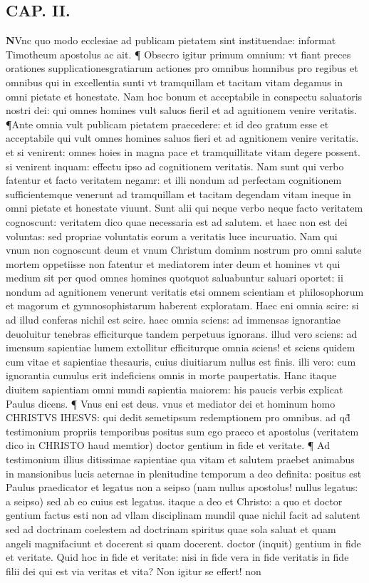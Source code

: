 \documentclass{article}
\begin{document}
\begin{pages}
\section{CAP. II.}\pstart \huge\textbf{N}\normalsize Vnc quo modo ecclesiae ad publicam pietatem sint instituendae: informat Timotheum apostolus ac ait. ¶ Obsecro igitur primum omnium: vt fiant preces orationes supplicationesgratiarum actiones pro omnibus homnibus pro regibus et omnibus qui in excellentia sunti vt tramquillam et tacitam vitam degamus in omni pietate et honestate. Nam hoc bonum et acceptabile in conspectu saluatoris nostri dei: qui omnes homines vult saluos fieril et ad agnitionem venire veritatis. ¶Ante omnia vult publicam pietatem praecedere: et id deo gratum esse et acceptabile qui vult omnes homines saluos fieri et ad agnitionem venire veritatis. et si venirent: omnes hoies in magna pace et tramquillitate vitam degere possent. si venirent inquam: effectu ipso ad cognitionem veritatis. Nam sunt qui verbo fatentur et facto veritatem negamr: et illi nondum ad perfectam cognitionem sufficientemque  venerunt ad tramquillam et tacitam degendam vitam ineque  in omni pietate et honestate viuunt. Sunt alii qui neque  verbo neque  facto veritatem cognoscunt: veritatem dico quae necessaria est ad salutem. et haec non est dei voluntas: sed propriae voluntatis eorum a veritatis luce incuruatio. Nam qui vnum non cognoscunt deum et vnum Christum dominm nostrum pro omni salute mortem oppetiisse non fatentur et mediatorem inter deum et homines vt qui medium sit per quod  omnes homines quotquot saluabuntur saluari oportet: ii nondum ad agnitionem venerunt veritatis etsi omnem scientiam et philosophorum et magorum et gymnosophistarum haberent exploratam. Haec eni omnia scire: si ad illud conferas nichil est scire. haec omnia sciens: ad immensas ignorantiae deuoluitur tenebras efficiturque  tandem perpetuus ignorans. illud vero sciens: ad imensum sapientiae lumem extollitur efficiturque  omnia sciens! et sciens quidem cum vitae et sapientiae thesauris, cuius diuitiarum nullus est finis. illi vero: cum ignorantia  cumulus erit indeficiens omnis in morte paupertatis. Hanc itaque  diuitem sapientiam omni mundi sapientia maiorem: his paucis verbis explicat Paulus dicens. ¶ Vnus eni est deus. vnus et mediator dei et hominum homo CHRISTVS IHESVS: qui dedit semetipsum redemptionem pro omnibus. ad qd̃ testimonium propriis   temporibus positus sum ego praeco et apostolus (veritatem dico in CHRISTO haud memtior) doctor gentium in fide et veritate. ¶ Ad testimonium illius ditissimae sapientiae qua vitam et salutem praebet animabus in mansionibus lucis aeternae  in plenitudine temporum a deo definita: positus est Paulus praedicator et legatus non a seipso (nam nullus apostolus! nullus legatus: a seipso) sed ab eo cuius est legatus. itaque  a deo et Christo: a quo et doctor gentium factus esti non ad vllam disciplinam mundil quae nichil facit ad salutent sed ad doctrinam coelestem  ad doctrinam spiritus  quae sola saluat et quam angeli magnifaciunt  et docerent si quam docerent. doctor (inquit) gentium in fide et veritate. Quid hoc in fide et veritate: nisi in fide vera  in fide veritatis in fide filii dei  qui est via veritas et vita? Non igitur se effert! non 
\end{pages}
\end{document}
